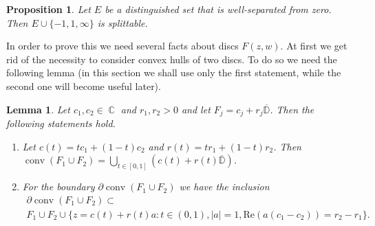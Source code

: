 \documentclass{amsart}
\numberwithin{equation}{section}
\newtheorem{lemma}[theorem]{Lemma}
\newtheorem{proposition}[theorem]{Proposition}
\theoremstyle{definition}
\theoremstyle{remark}
\DeclareMathOperator{\conv}{conv}
\DeclareMathOperator{\CC}{\mathbb C}
\begin{document}
	\begin{proposition}\label{propIfWellSeparatedThenSplittable}
		Let $E$ be a distinguished set that is well-separated from zero. Then $E \cup \{-1,1,\infty\}$ is splittable.
	\end{proposition}
	
	In order to prove this we need several facts about discs $F(z,w)$. At first we get rid of the necessity to consider convex hulls of two discs. To do so we need the following lemma (in this section we shall use only the first statement, while the second one will become useful later).
	
	\begin{lemma}\label{lemConvexHullDescription}
		Let $c_1, c_2 \in \CC$ and $r_1, r_2 > 0$ and let $F_j = c_j + r_j \overline{\mathbb D}$. Then the following statements hold.
		\begin{enumerate}[label=(\roman*)]
			\item\label{convexHulli} Let $c(t) = tc_1 + (1-t)c_2$ and $r(t) = tr_1 + (1-t)r_2$. Then $\conv(F_1 \cup F_2) = \bigcup_{t \in [0,1]} \left(c(t) + r(t)\overline{\mathbb D}\right)$.
			\item\label{convexHullii} For the boundary $\partial \conv(F_1 \cup F_2)$ we have the inclusion
			\begin{multline*}
				\partial \conv(F_1 \cup F_2) \subset \\  F_1 \cup F_2 \cup \{z = c(t) + r(t)a: t \in (0,1), |a| = 1, \mathrm{Re}(a(c_1 - c_2)) = r_2 - r_1\}.
			\end{multline*}
		\end{enumerate}
	\end{lemma}
\end{document}

